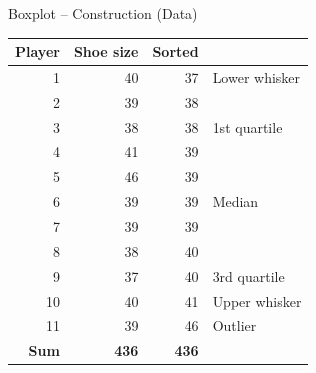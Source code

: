 \documentclass[aspectratio=169,11pt]{beamer}
\begin{document}
\begin{frame}{Boxplot -- Construction (Data)}
  \begin{center}
    \renewcommand{\arraystretch}{1.05}
    \small
    \begin{tabular}{rrrl}
      \toprule
      \textbf{Player} & \textbf{Shoe size} & \textbf{Sorted} & \\
      \midrule
      1 & 40 & 37 & Lower whisker \\
      2 & 39 & 38 & \\
      3 & 38 & 38 & 1st quartile \\
      4 & 41 & 39 & \\
      5 & 46 & 39 & \\
      6 & 39 & 39 & Median \\
      7 & 39 & 39 & \\
      8 & 38 & 40 & \\
      9 & 37 & 40 & 3rd quartile \\
      10 & 40 & 41 & Upper whisker \\
      11 & 39 & 46 & Outlier \\
      \midrule
      \textbf{Sum} & \textbf{436} & \textbf{436} & \\
      \bottomrule
    \end{tabular}
  \end{center}
\end{frame}
\end{document}
